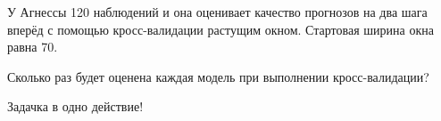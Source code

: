 
\begin{question}
У Агнессы 120 наблюдений и она оценивает качество прогнозов на два шага вперёд с помощью кросс-валидации
растущим окном. Стартовая ширина окна равна 70.

Сколько раз будет оценена каждая модель при выполнении кросс-валидации?
\end{question}

\begin{solution}
Задачка в одно действие!
\end{solution}

